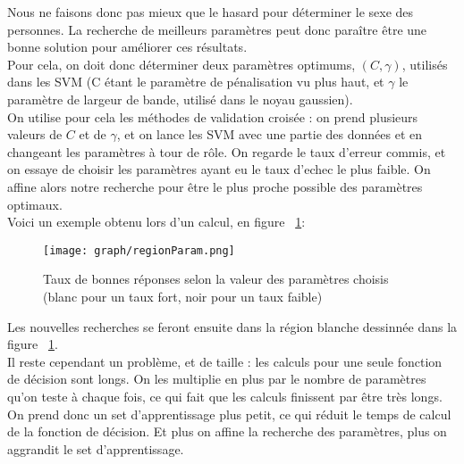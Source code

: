 Nous ne faisons donc pas mieux que le hasard pour déterminer le sexe des personnes. La recherche de meilleurs paramètres peut donc paraître être une bonne solution pour améliorer ces résultats. \\
Pour cela, on doit donc déterminer deux paramètres optimums, $(C,\gamma)$, utilisés dans les SVM (C étant le paramètre de pénalisation vu plus haut, et $\gamma$ le paramètre de largeur de bande, utilisé dans le noyau gaussien). \\
On utilise pour cela les méthodes de validation croisée : on prend plusieurs valeurs de $C$ et de $\gamma$, et on lance les SVM avec une partie des données et en changeant les paramètres à tour de rôle. On regarde le taux d'erreur commis, et on essaye de choisir les paramètres ayant eu le taux d'echec le plus faible. On affine alors notre recherche pour être le plus proche possible des paramètres optimaux.\\
Voici un exemple obtenu lors d'un calcul, en figure ~\ref{figParam}:
\begin{figure}[!h]
\centering
\texttt{[image: graph/regionParam.png]}
\caption{Taux de bonnes réponses selon la valeur des paramètres choisis (blanc pour un taux fort, noir pour un taux faible)}
\label{figParam}
\end{figure}

\newpage
Les nouvelles recherches se feront ensuite dans la région blanche dessinnée dans la figure ~\ref{figParam}. \\
Il reste cependant un problème, et de taille : les calculs pour une seule fonction de décision sont longs. On les multiplie en plus par le nombre de paramètres qu'on teste à chaque fois, ce qui fait que les calculs finissent par être très longs. On prend donc un set d'apprentissage plus petit, ce qui réduit le temps de calcul de la fonction de décision. Et plus on affine la recherche des paramètres, plus on aggrandit le set d'apprentissage.

